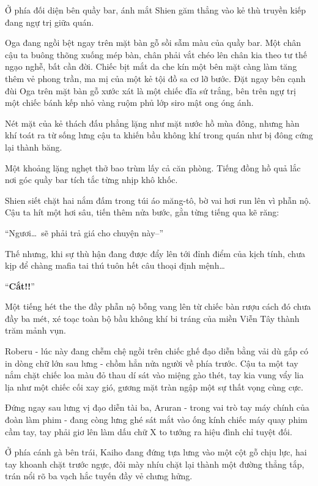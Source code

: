 \documentclass[../main.tex]{subfiles}
\begin{document}

Ở phía đối diện bên quầy bar, ánh mắt Shien găm thẳng vào kẻ thù truyền kiếp đang ngự trị giữa quán.

Oga đang ngồi bệt ngay trên mặt bàn gỗ sồi sẫm màu của quầy bar. Một chân cậu ta buông thõng xuống mép bàn, chân phải vắt chéo lên chân kia theo tư thế ngạo nghễ, bất cần đời. Chiếc bịt mắt da che kín một bên mặt càng làm tăng thêm vẻ phong trần, ma mị của một kẻ tội đồ sa cơ lỡ bước. Đặt ngay bên cạnh đùi Oga trên mặt bàn gỗ xước xát là một chiếc đĩa sứ trắng, bên trên ngự trị một chiếc bánh kếp nhỏ vàng ruộm phủ lớp siro mật ong óng ánh.


Nét mặt của kẻ thách đấu phẳng lặng như mặt nước hồ mùa đông, nhưng hàn khí toát ra từ sống lưng cậu ta khiến bầu không khí trong quán như bị đông cứng lại thành băng.

Một khoảng lặng nghẹt thở bao trùm lấy cả căn phòng. Tiếng đồng hồ quả lắc nơi góc quầy bar tích tắc từng nhịp khô khốc.

Shien siết chặt hai nắm đấm trong túi áo măng-tô, bờ vai hơi run lên vì phẫn nộ. Cậu ta hít một hơi sâu, tiến thêm nửa bước, gằn từng tiếng qua kẽ răng:

``Ngươi\dots\ sẽ phải trả giá cho chuyện này--''

Thế nhưng, khi sự thù hận đang được đẩy lên tới đỉnh điểm của kịch tính, chưa kịp để chàng mafia tai thú tuôn hết câu thoại định mệnh\dots

``\textbf{Cắt!!}''

\il

Một tiếng hét the the đầy phẫn nộ bỗng vang lên từ chiếc bàn rượu cách đó chưa đầy ba mét, xé toạc toàn bộ bầu không khí bi tráng của miền Viễn Tây thành trăm mảnh vụn.

Roberu - lúc này đang chễm chệ ngồi trên chiếc ghế đạo diễn bằng vải dù gấp có in dòng chữ lớn sau lưng - chồm hẳn nửa người về phía trước. Cậu ta một tay nắm chặt chiếc loa màu đỏ thau dí sát vào miệng gào thét, tay kia vung vẩy lia lịa như một chiếc cối xay gió, gương mặt tràn ngập một sự thất vọng cùng cực.

Đứng ngay sau lưng vị đạo diễn tài ba, Aruran - trong vai trò tay máy chính của đoàn làm phim - đang còng lưng ghé sát mắt vào ống kính chiếc máy quay phim cầm tay, tay phải giơ lên làm dấu chữ X to tướng ra hiệu đình chỉ tuyệt đối.

Ở phía cánh gà bên trái, Kaiho đang đứng tựa lưng vào một cột gỗ chịu lực, hai tay khoanh chặt trước ngực, đôi mày nhíu chặt lại thành một đường thẳng tắp, trán nổi rõ ba vạch hắc tuyến đầy vẻ chưng hửng.
\end{document}
